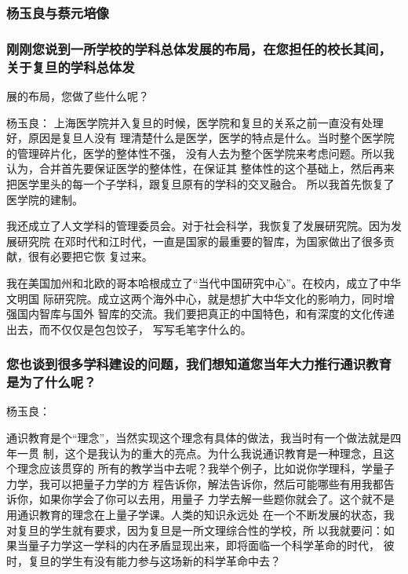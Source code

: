 \documentclass[11pt]{ctexart}
\begin{document}
{{{{\subsubsection{杨玉良与蔡元培像}
\label{sec:org93f2d6e}

\subsubsection{刚刚您说到一所学校的学科总体发展的布局，在您担任的校长其间，关于复旦的学科总体发}
\label{sec:org2f11099}
展的布局，您做了些什么呢？

杨玉良：
上海医学院并入复旦的时候，医学院和复旦的关系之前一直没有处理好，原因是复旦人没有
理清楚什么是医学，医学的特点是什么。当时整个医学院的管理碎片化，医学的整体性不强，
没有人去为整个医学院来考虑问题。所以我认为，合并首先要保证医学的整体性，在保证其
整体性的这个基础上，然后再来把医学里头的每一个子学科，跟复旦原有的学科的交叉融合。
所以我首先恢复了医学院的建制。

我还成立了人文学科的管理委员会。对于社会科学，我恢复了发展研究院。因为发展研究院
在邓时代和江时代，一直是国家的最重要的智库，为国家做出了很多贡献，很有必要把它恢
复过来。

我在美国加州和北欧的哥本哈根成立了“当代中国研究中心”。在校内，成立了中华文明国
际研究院。成立这两个海外中心，就是想扩大中华文化的影响力，同时增强国内智库与国外
智库的交流。我们要把真正的中国特色，和有深度的文化传递出去，而不仅仅是包包饺子，
写写毛笔字什么的。


\subsubsection{您也谈到很多学科建设的问题，我们想知道您当年大力推行通识教育是为了什么呢？}
\label{sec:org015e29a}

杨玉良：

通识教育是个“理念”，当然实现这个理念有具体的做法，我当时有一个做法就是四年一贯
制，这个是我认为的重大的亮点。为什么我说通识教育是一种理念，且这个理念应该贯穿的
所有的教学当中去呢？我举个例子，比如说你学理科，学量子力学，我可以把量子力学的方
程告诉你，解法告诉你，然后可能哪些有用我都告诉你，如果你学会了你可以去用，用量子
力学去解一些题你就会了。这个就不是用通识教育的理念在上量子学课。人类的知识永远处
在一个不断发展的状态，我对复旦的学生就有要求，因为复旦是一所文理综合性的学校，所
以我就要问：如果当量子力学这一学科的内在矛盾显现出来，即将面临一个科学革命的时代，
彼时，复旦的学生有没有能力参与这场新的科学革命中去？

}}}}
\end{document}

